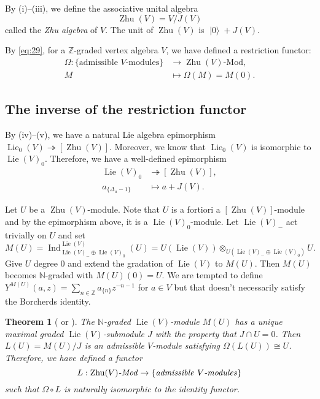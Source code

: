 \documentclass[a4paper, 12pt, reqno]{amsart}
\newtheorem{theorem}{Theorem}[section]
\theoremstyle{remark}
\numberwithin{equation}{subsection}
\DeclareMathOperator{\Ind}{Ind}
\DeclareMathOperator{\vac}{|0\rangle}
\DeclareMathOperator{\Lie}{Lie}
\DeclareMathOperator{\Zhu}{Zhu}
\begin{document}
By (i)--(iii), we define the associative unital algebra
\begin{equation*}
  \Zhu(V) = V/J(V)
\end{equation*}
called the \emph{Zhu algebra} of $V$.
The unit of $\Zhu(V)$ is $\vac + J(V)$.

By \eqref{eq:29}, for a $\mathbb{Z}$-graded vertex algebra $V$, we have defined a restriction functor:
\begin{align*}
  \Omega: \{\text{admissible $V$-modules}\} &\to \Zhu(V)\text{-Mod}, \\
  M &\mapsto \Omega(M) = M(0).
\end{align*}

\subsection{The inverse of the restriction functor}
\label{sec:inverse-restr-funct}

By (iv)--(v), we have a natural Lie algebra epimorphism $\Lie_0(V) \twoheadrightarrow [\Zhu(V)]$.
Moreover, we know that $\Lie_0(V)$ is isomorphic to $\Lie(V)_0$.
Therefore, we have a well-defined epimorphism
\begin{align*}
  \Lie(V)_0 &\twoheadrightarrow [\Zhu(V)], \\
  a_{\{\Delta_a - 1\}} &\mapsto a + J(V).
\end{align*}

Let $U$ be a $\Zhu(V)$-module.
Note that $U$ is a fortiori a $[\Zhu(V)]$-module and by the epimorphism above, it is a $\Lie(V)_0$-module.
Let $\Lie(V)_-$ act trivially on $U$ and set
\begin{equation*}
  M(U) = \Ind^{\Lie(V)}_{\Lie(V)_- \oplus \Lie(V)_0}(U) = U(\Lie(V)) \otimes_{U(\Lie(V)_- \oplus \Lie(V)_0)} U.
\end{equation*}
Give $U$ degree $0$ and extend the gradation of $\Lie(V)$ to $M(U)$.
Then $M(U)$ becomes $\mathbb{N}$-graded with $M(U)(0) = U$.
We are tempted to define $Y^{M(U)}(a, z) = \sum_{n \in \mathbb{Z}}a_{\{n\}}z^{-n - 1}$ for $a \in V$ but that doesn't necessarily satisfy the Borcherds identity.

\begin{theorem}[{\cite[\S2]{de_sole_finite_2006} or \cite{dong_twisted_1998}}]
  \label{thr:35}
  The $\mathbb{N}$-graded $\Lie(V)$-module $M(U)$ has a unique maximal graded $\Lie(V)$-submodule $J$ with the property that $J \cap U = 0$.
  Then $L(U) = M(U)/J$ is an admissible $V$-module satisfying $\Omega(L(U)) \cong U$.
  Therefore, we have defined a functor
  \begin{equation*}
  L: \Zhu(V)\text{\emph{-Mod}} \to \{\text{\emph{admissible }$V$\emph{-modules}}\}
  \end{equation*}
  such that $\Omega \circ L$ is naturally isomorphic to the identity functor.
\end{theorem}
\end{document}
